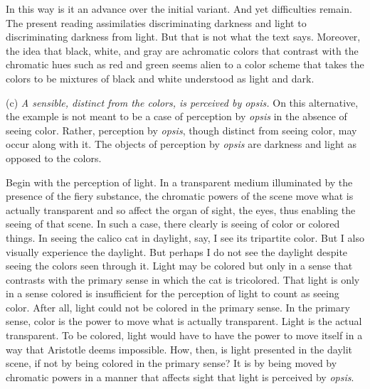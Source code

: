 In this way is it an advance over the initial variant. And yet difficulties remain. The present reading assimilaties discriminating darkness and light to discriminating darkness from light. But that is not what the text says. Moreover, the idea that black, white, and gray are achromatic colors that contrast with the chromatic hues such as red and green seems alien to a color scheme that takes the colors to be mixtures of black and white understood as light and dark.

(c) \emph{A sensible, distinct from the colors, is perceived by \emph{opsis}.} On this alternative, the example is not meant to be a case of perception by \emph{opsis} in the absence of seeing color. Rather, perception by \emph{opsis}, though distinct from seeing color, may occur along with it. The objects of perception by \emph{opsis} are darkness and light as opposed to the colors. 

Begin with the perception of light. In a transparent medium illuminated by the presence of the fiery substance, the chromatic powers of the scene move what is actually transparent and so affect the organ of sight, the eyes, thus enabling the seeing of that scene. In such a case, there clearly is seeing of color or colored things. In seeing the calico cat in daylight, say, I see its tripartite color. But I also visually experience the daylight. But perhaps I do not see the daylight despite seeing the colors seen through it. Light may be colored but only in a sense that contrasts with the primary sense in which the cat is tricolored. That light is only in a sense colored is insufficient for the perception of light to count as seeing color. After all, light could not be colored in the primary sense. In the primary sense, color is the power to move what is actually transparent. Light is the actual transparent. To be colored, light would have to have the power to move itself in a way that Aristotle deems impossible. How, then, is light presented in the daylit scene, if not by being colored in the primary sense? It is by being moved by chromatic powers in a manner that affects sight that light is perceived by \emph{opsis}.

